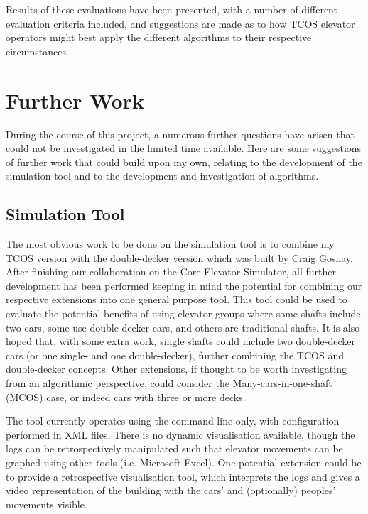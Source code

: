 \documentclass{UoYCSproject}
\begin{document}
Results of these evaluations have been presented, with a number of different evaluation criteria included, and suggestions are made as to how TCOS elevator operators might best apply the different algorithms to their respective circumstances.

\section{Further Work}

During the course of this project, a numerous further questions have arisen that could not be investigated in the limited time available.  Here are some suggestions of further work that could build upon my own, relating to the development of the simulation tool and to the development and investigation of algorithms.

\subsection{Simulation Tool}

The most obvious work to be done on the simulation tool is to combine my TCOS version with the double-decker version which was built by Craig Gosnay.  After finishing our collaboration on the Core Elevator Simulator, all further development has been performed keeping in mind the potential for combining our respective extensions into one general purpose tool.  This tool could be used to evaluate the potential benefits of using elevator groups where some shafts include two cars, some use double-decker cars, and others are traditional shafts.  It is also hoped that, with some extra work, single shafts could include two double-decker cars (or one single- and one double-decker), further combining the TCOS and double-decker concepts.  Other extensions, if thought to be worth investigating from an algorithmic perspective, could consider the Many-cars-in-one-shaft (MCOS) case, or indeed cars with three or more decks.

The tool currently operates using the command line only, with configuration performed in XML files.  There is no dynamic visualisation available, though the logs can be retrospectively manipulated such that elevator movements can be graphed using other tools (i.e. Microsoft Excel).  One potential extension could be to provide a retrospective visualisation tool, which interprets the logs and gives a video representation of the building with the cars' and (optionally) peoples' movements visible.
\end{document}
